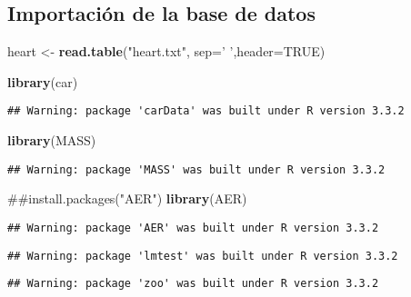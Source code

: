\documentclass[]{article}
\newenvironment{Shaded}{\begin{snugshade}}{\end{snugshade}}
\newcommand{\KeywordTok}[1]{\textcolor[rgb]{0.13,0.29,0.53}{\textbf{#1}}}
\newcommand{\DataTypeTok}[1]{\textcolor[rgb]{0.13,0.29,0.53}{#1}}
\newcommand{\StringTok}[1]{\textcolor[rgb]{0.31,0.60,0.02}{#1}}
\newcommand{\OtherTok}[1]{\textcolor[rgb]{0.56,0.35,0.01}{#1}}
\newcommand{\NormalTok}[1]{#1}
\begin{document}
\subsection{Importación de la base de
datos}\label{importacion-de-la-base-de-datos}

\begin{Shaded}
\begin{Highlighting}[]
\NormalTok{heart <-}\StringTok{ }\KeywordTok{read.table}\NormalTok{(}\StringTok{"heart.txt"}\NormalTok{, }\DataTypeTok{sep=}\StringTok{' '}\NormalTok{,}\DataTypeTok{header=}\OtherTok{TRUE}\NormalTok{)}
\end{Highlighting}
\end{Shaded}

\begin{Shaded}
\begin{Highlighting}[]
\KeywordTok{library}\NormalTok{(car)}
\end{Highlighting}
\end{Shaded}

\begin{verbatim}
## Warning: package 'carData' was built under R version 3.3.2
\end{verbatim}

\begin{Shaded}
\begin{Highlighting}[]
\KeywordTok{library}\NormalTok{(MASS)}
\end{Highlighting}
\end{Shaded}

\begin{verbatim}
## Warning: package 'MASS' was built under R version 3.3.2
\end{verbatim}

\begin{Shaded}
\begin{Highlighting}[]
\NormalTok{##install.packages("AER")}
\KeywordTok{library}\NormalTok{(AER)}
\end{Highlighting}
\end{Shaded}

\begin{verbatim}
## Warning: package 'AER' was built under R version 3.3.2
\end{verbatim}

\begin{verbatim}
## Warning: package 'lmtest' was built under R version 3.3.2
\end{verbatim}

\begin{verbatim}
## Warning: package 'zoo' was built under R version 3.3.2
\end{verbatim}
\end{document}
